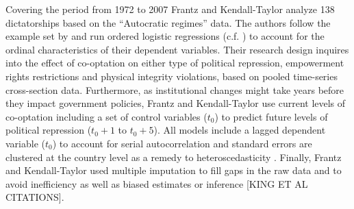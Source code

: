 Covering the period from 1972 to 2007 Frantz and 
Kendall-Taylor analyze 138 dictatorships based on the 
``Autocratic regimes'' data. The authors follow the example
set by \citet{Vreeland.2008} and run ordered logistic
regressions (c.f. \cite{Fox.2008,Fox.2011}) to account for
the ordinal characteristics of their dependent variables.
Their research design inquires into the effect of 
co-optation on either type of political repression, 
empowerment rights restrictions and physical integrity 
violations, based on pooled time-series cross-section data.
Furthermore, as institutional changes might take 
years before they impact government policies, Frantz and 
Kendall-Taylor use current levels of co-optation including
a set of control variables ($t_0$) to predict future levels 
of political repression ($t_0+1$ to $t_0+5$). All models 
include a lagged dependent variable ($t_0$) to account for 
serial autocorrelation and standard errors are clustered at 
the country level as a remedy to heteroscedasticity 
\citep{Beck.1995}. Finally, Frantz and Kendall-Taylor used
multiple imputation to fill gaps in the raw data and to 
avoid inefficiency as well as biased estimates or inference 
[KING ET AL CITATIONS].





